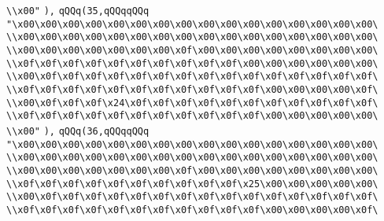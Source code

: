 \verb|\\x00"|\newline
\verb|),|\newline
\verb|qQQq(35,qQQqqQQq|\newline
\verb|"\x00\x00\x00\x00\x00\x00\x00\x00\x00\x00\x00\x00\x00\x00\x00\x00\|\newline
\verb|\\x00\x00\x00\x00\x00\x00\x00\x00\x00\x00\x00\x00\x00\x00\x00\x00\|\newline
\verb|\\x00\x00\x00\x00\x00\x00\x00\x0f\x00\x00\x00\x00\x00\x00\x00\x00\|\newline
\verb|\\x0f\x0f\x0f\x0f\x0f\x0f\x0f\x0f\x0f\x0f\x00\x00\x00\x00\x00\x00\|\newline
\verb|\\x00\x0f\x0f\x0f\x0f\x0f\x0f\x0f\x0f\x0f\x0f\x0f\x0f\x0f\x0f\x0f\|\newline
\verb|\\x0f\x0f\x0f\x0f\x0f\x0f\x0f\x0f\x0f\x0f\x0f\x00\x00\x00\x00\x0f\|\newline
\verb|\\x00\x0f\x0f\x0f\x24\x0f\x0f\x0f\x0f\x0f\x0f\x0f\x0f\x0f\x0f\x0f\|\newline
\verb|\\x0f\x0f\x0f\x0f\x0f\x0f\x0f\x0f\x0f\x0f\x0f\x00\x00\x00\x00\x00\|\newline
\verb|\\x00"|\newline
\verb|),|\newline
\verb|qQQq(36,qQQqqQQq|\newline
\verb|"\x00\x00\x00\x00\x00\x00\x00\x00\x00\x00\x00\x00\x00\x00\x00\x00\|\newline
\verb|\\x00\x00\x00\x00\x00\x00\x00\x00\x00\x00\x00\x00\x00\x00\x00\x00\|\newline
\verb|\\x00\x00\x00\x00\x00\x00\x00\x0f\x00\x00\x00\x00\x00\x00\x00\x00\|\newline
\verb|\\x0f\x0f\x0f\x0f\x0f\x0f\x0f\x0f\x0f\x0f\x25\x00\x00\x00\x00\x00\|\newline
\verb|\\x00\x0f\x0f\x0f\x0f\x0f\x0f\x0f\x0f\x0f\x0f\x0f\x0f\x0f\x0f\x0f\|\newline
\verb|\\x0f\x0f\x0f\x0f\x0f\x0f\x0f\x0f\x0f\x0f\x0f\x00\x00\x00\x00\x0f\|\newline
